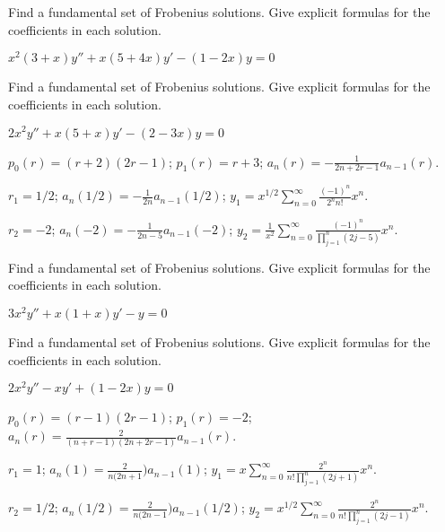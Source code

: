 \documentclass{ximera}
\begin{document}
\begin{problem}\label{exer:7.5.15} 
Find a
fundamental set of Frobenius solutions. Give explicit formulas for the
coefficients in each solution.

$x^2(3+x)y''+x(5+4x)y'-(1-2x)y=0$

\end{problem}

\begin{problem}\label{exer:7.5.16} 
Find a
fundamental set of Frobenius solutions. Give explicit formulas for the
coefficients in each solution.

$2x^2y''+x(5+x)y'-(2-3x)y=0$

\begin{solution}
    $p_0(r)=(r+2)(2r-1)$;
$p_1(r)=r+3$;
$a_n(r)=-\frac{1}{ 2n+2r-1}a_{n-1}(r)$.

$r_1=1/2$;
$a_n(1/2)= -\frac{1}{ 2n}a_{n-1}(1/2)$;
$y_1=x^{1/2}\sum_{n=0}^\infty \frac{(-1)^n}{2^nn!}x^n$.


$r_2=-2$;
$a_n(-2)=-\frac{1}{ 2n-5}a_{n-1}(-2)$;
$y_2=\frac{1}{ x^2}\sum_{n=0}^\infty\frac{(-1)^n}{\prod_{j=1}^n(2j-5)}
x^n$.
\end{solution}

\end{problem}

\begin{problem}\label{exer:7.5.17} 
Find a
fundamental set of Frobenius solutions. Give explicit formulas for the
coefficients in each solution.

$3x^2y''+x(1+x)y'-y=0$

\end{problem}

\begin{problem}\label{exer:7.5.18} 
Find a
fundamental set of Frobenius solutions. Give explicit formulas for the
coefficients in each solution.

$2x^2y''-xy'+(1-2x)y=0$

\begin{solution}
    $p_0(r)=(r-1)(2r-1)$;
$p_1(r)= -2$;
$a_n(r)=\frac{2}{ (n+r-1)(2n+2r-1)}a_{n-1}(r)$.

$r_1=1$;
$a_n(1)=\frac{2}{ n(2n+1})a_{n-1}(1)$;
$y_1=x\sum_{n=0}^\infty\frac{2^n}{
n!\prod_{j=1}^n(2j+1)}x^n$.

$r_2=1/2$;
$a_n(1/2)=\frac{2}{ n(2n-1})a_{n-1}(1/2)$;
$y_2=x^{1/2}\sum_{n=0}^\infty\frac{2^n}{
n!\prod_{j=1}^n(2j-1)}x^n$.

\end{solution}

\end{problem}
\end{document}

